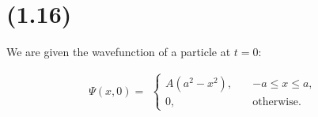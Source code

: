 \section{(1.16)}

We are given the wavefunction of a particle at $t=0$:

\begin{equation}
    \Psi(x,0) = 
        \begin{alignedat}{1}
        \begin{cases}
            A(a^2-x^2), \quad & -a \leq x \leq a, \\
            0, & \text{otherwise}.
        \end{cases}
        \end{alignedat}
\end{equation}


